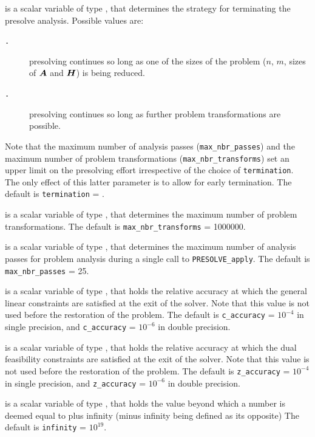 \documentclass{galahad}
\newcommand{\packagename}{PRESOLVE}
\newcommand{\sym}{\tt\small}
\begin{document}
\begin{description}
 is a scalar variable of type \integer, that
determines the strategy for terminating the presolve analysis.
Possible values are:
\begin{description}
\item[\sym \galsymreducedsize.]  presolving continues so long as one of
            the sizes of the problem ($n$, $m$, sizes of ${\bm{A}}$ and ${\bm{H}}$) is
            being reduced.
\item[\sym \galsymfullpresolve.] presolving continues so long as further
            problem transformations are possible.
\end{description}
Note that the maximum number of analysis passes ({\tt max\_nbr\_passes})  and
the maximum number of problem transformations ({\tt max\_nbr\_transforms})
set an upper limit on the  presolving effort irrespective of the choice of
{\tt termination}. The only effect of this latter parameter is to allow for
early termination.
The default is {\tt termination} = {\sym \galsymreducedsize}.

 is a scalar variable of type \integer, that
determines the maximum number of problem transformations.
The default is {\tt max\_nbr\_transforms} = 1000000.

 is a scalar variable of type \integer, that
determines the maximum number of analysis passes for problem analysis
during a single call to {\tt \packagename\_apply}.
The default is {\tt max\_nbr\_passes} = 25.

 is a scalar variable of type \realdp, that holds the
relative accuracy at which the general linear constraints are satisfied at
the exit of the solver. Note that this value is not used before the restoration
of the problem.
The default is {\tt c\_accuracy} = $10^{-4}$ in single precision, and
{\tt c\_accuracy} = $10^{-6}$ in double precision.

 is a scalar variable of type \realdp, that holds the
relative accuracy at which the dual feasibility constraints are satisfied at
the exit of the solver. Note that this value is not used before the restoration
of the problem.
The default is {\tt z\_accuracy} = $10^{-4}$ in single precision, and
{\tt z\_accuracy} = $10^{-6}$ in double precision.

 is a scalar variable of type \realdp, that holds the
value beyond which a number is deemed equal to plus infinity
(minus infinity being defined as its opposite)
The default is {\tt infinity} = $10^{19}$.


\end{description}
\end{document}
